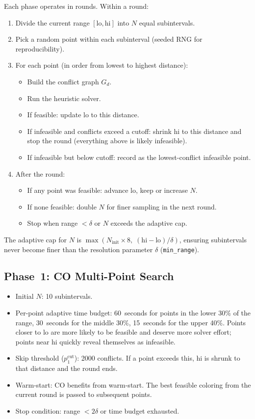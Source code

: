 \documentclass[11pt,a4paper]{article}
\begin{document}
Each phase operates in rounds. Within a round:
\begin{enumerate}
  \item Divide the current range $[\text{lo}, \text{hi}]$ into $N$ equal subintervals.
  \item Pick a random point within each subinterval (seeded RNG for reproducibility).
  \item For each point (in order from lowest to highest distance):
    \begin{itemize}
      \item Build the conflict graph $G_d$.
      \item Run the heuristic solver.
      \item If feasible: update lo to this distance.
      \item If infeasible and conflicts exceed a cutoff: shrink hi to this distance and
            stop the round (everything above is likely infeasible).
      \item If infeasible but below cutoff: record as the lowest-conflict infeasible
            point.
    \end{itemize}
  \item After the round:
    \begin{itemize}
      \item If any point was feasible: advance lo, keep or increase $N$.
      \item If none feasible: double $N$ for finer sampling in the next round.
      \item Stop when range $< \delta$ or $N$ exceeds the adaptive cap.
    \end{itemize}
\end{enumerate}

The adaptive cap for $N$ is
$\max(N_{\text{init}} \times 8,\; (\text{hi} - \text{lo}) / \delta)$, ensuring
subintervals never become finer than the resolution parameter $\delta$
(\texttt{min\_range}).

\subsection{Phase~1: CO Multi-Point Search}

\begin{itemize}
  \item Initial $N$: 10 subintervals.
  \item Per-point adaptive time budget: 60~seconds for points in the lower 30\% of the
        range, 30~seconds for the middle 30\%, 15~seconds for the upper 40\%. Points
        closer to lo are more likely to be feasible and deserve more solver effort; points
        near hi quickly reveal themselves as infeasible.
  \item Skip threshold ($p_1^{\text{cut}}$): 2000 conflicts. If a point exceeds this, hi
        is shrunk to that distance and the round ends.
  \item Warm-start: CO benefits from warm-start. The best feasible coloring from the
        current round is passed to subsequent points.
  \item Stop condition: range $< 2\delta$ or time budget exhausted.
\end{itemize}
\end{document}
